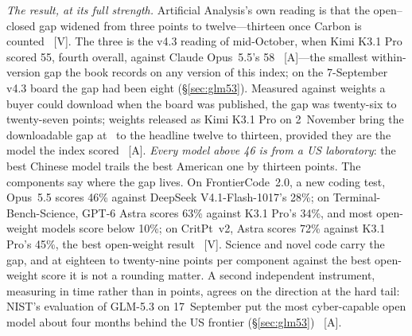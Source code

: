 \emph{The result, at its full strength.} Artificial Analysis's own reading is that the open--closed gap widened from three points to twelve---thirteen once Carbon is counted~\cite{mdl-aa-v5} [V]. The three is the v4.3 reading of mid-October, when Kimi K3.1 Pro scored 55, fourth overall, against Claude Opus~5.5's 58~\cite{mdl-kimi-k31} [A]---the smallest within-version gap the book records on any version of this index; on the 7-September v4.3 board the gap had been eight (\S\ref{sec:glm53}). Measured against weights a buyer could download when the board was published, the gap was twenty-six to twenty-seven points; weights released as Kimi K3.1 Pro on 2~November bring the downloadable gap at \datafreeze\ to the headline twelve to thirteen, provided they are the model the index scored~\cite{lit-k31-weights} [A]. \emph{Every model above 46 is from a US laboratory}: the best Chinese model trails the best American one by thirteen points. The components say where the gap lives. On FrontierCode~2.0, a new coding test, Opus~5.5 scores 46\% against DeepSeek V4.1-Flash-1017's 28\%; on Terminal-Bench-Science, GPT-6 Astra scores 63\% against K3.1 Pro's 34\%, and most open-weight models score below 10\%; on CritPt~v2, Astra scores 72\% against K3.1 Pro's 45\%, the best open-weight result~\cite{mdl-aa-v5} [V]. Science and novel code carry the gap, and at eighteen to twenty-nine points per component against the best open-weight score it is not a rounding matter. A second independent instrument, measuring in time rather than in points, agrees on the direction at the hard tail: NIST's evaluation of GLM-5.3 on 17~September put the most cyber-capable open model about four months behind the US frontier (\S\ref{sec:glm53})~\cite{mdl-caissi-glm53} [A].

